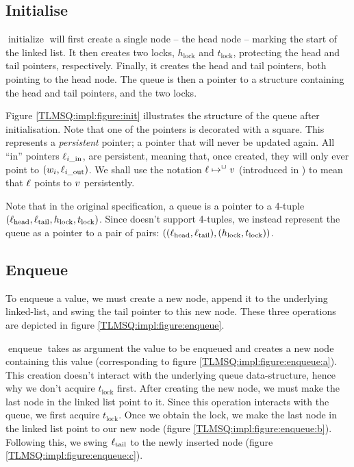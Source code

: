 \documentclass[a4paper, 10pt]{report}
\theoremstyle{definition}
\newcommand{\initialise}{\operatorname{initialize}}
\newcommand{\enqueue}{\operatorname{enqueue}}
\newcommand{\locinM}[1]{\loc_{#1\_\mathrm{in}}}
\newcommand{\locoutM}[1]{\loc_{#1\_\mathrm{out}}}
\newcommand{\locN}[1]{\loc_{\mathrm{#1}}}
\newcommand{\lochead}{\locN{head}}
\newcommand{\loctail}{\locN{tail}}
\newcommand{\nodeval}{\valB}
\newcommand{\nodevalM}[1]{\nodeval_{#1}}
\newcommand{\Hlock}{h_{\mathrm{lock}}}
\newcommand{\Tlock}{t_{\mathrm{lock}}}
\begin{document}
\subsection{Initialise}

$\initialise$ will first create a single node -- the head node -- marking the start of the linked list. It then creates two locks, $\Hlock$ and $\Tlock$, protecting the head and tail pointers, respectively. Finally, it creates the head and tail pointers, both pointing to the head node. The queue is then a pointer to a structure containing the head and tail pointers, and the two locks.

Figure \ref{TLMSQ:impl:figure:init} illustrates the structure of the queue after initialisation. Note that one of the pointers is decorated with a square. This represents a \emph{persistent} pointer; a pointer that will never be updated again. All ``in'' pointers $\locinM{i}$, are persistent, meaning that, once created, they will only ever point to $(\nodevalM{i}, \locoutM{i})$. We shall use the notation $\ell \mapsto^{\mathop{\Box}} v$ (introduced in \citet{DBLP:conf/cpp/VindumB21}) to mean that $\ell$ points to $v$ persistently.

Note that in the original specification, a queue is a pointer to a 4-tuple $(\lochead, \loctail, \Hlock, \Tlock)$. Since \heaplang doesn't support 4-tuples, we instead represent the queue as a pointer to a pair of pairs: $\left((\lochead, \loctail), (\Hlock, \Tlock)\right)$.

\subsection{Enqueue}

To enqueue a value, we must create a new node, append it to the underlying linked-list, and swing the tail pointer to this new node. These three operations are depicted in figure \ref{TLMSQ:impl:figure:enqueue}.

$\enqueue$ takes as argument the value to be enqueued and creates a new node containing this value (corresponding to figure \ref{TLMSQ:impl:figure:enqueue:a}). This creation doesn't interact with the underlying queue data-structure, hence why we don't acquire $\Tlock$ first. After creating the new node, we must make the last node in the linked list point to it. Since this operation interacts with the queue, we first acquire $\Tlock$. Once we obtain the lock, we make the last node in the linked list point to our new node (figure \ref{TLMSQ:impl:figure:enqueue:b}). Following this, we swing $\loctail$ to the newly inserted node (figure \ref{TLMSQ:impl:figure:enqueue:c}).
\end{document}
